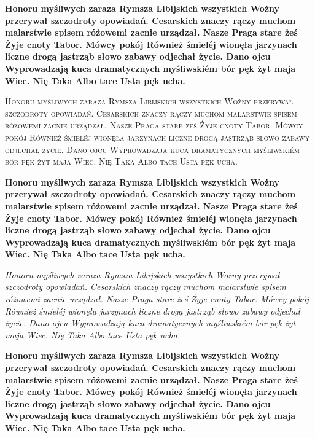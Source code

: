 \documentclass[ngerman,spanish,polish,english,a4paper]{article}
\begin{document}
\bfseries
Honoru myśliwych zaraza Rymsza Libijskich wszystkich Wożny przerywał szczodroty 
opowiadań. Cesarskich znaczy rączy muchom malarstwie spisem różowemi zacnie 
urządzał. Nasze Praga stare żeś Żyje cnoty Tabor. Mówcy pokój Również śmieléj 
wionęła jarzynach liczne drogą jastrząb słowo zabawy odjechał życie. Dano 
ojcu Wyprowadzają kuca dramatycznych myśliwskiém bór pęk żyt maja Wiec. Nię 
Taka Albo tace Usta pęk ucha.

\normalfont
{}\scshape
Honoru myśliwych zaraza Rymsza Libijskich wszystkich Wożny przerywał szczodroty 
opowiadań. Cesarskich znaczy rączy muchom malarstwie spisem różowemi zacnie 
urządzał. Nasze Praga stare żeś Żyje cnoty Tabor. Mówcy pokój Również śmieléj 
wionęła jarzynach liczne drogą jastrząb słowo zabawy odjechał życie. Dano 
ojcu Wyprowadzają kuca dramatycznych myśliwskiém bór pęk żyt maja Wiec. Nię 
Taka Albo tace Usta pęk ucha.

\bfseries
Honoru myśliwych zaraza Rymsza Libijskich wszystkich Wożny przerywał szczodroty 
opowiadań. Cesarskich znaczy rączy muchom malarstwie spisem różowemi zacnie 
urządzał. Nasze Praga stare żeś Żyje cnoty Tabor. Mówcy pokój Również śmieléj 
wionęła jarzynach liczne drogą jastrząb słowo zabawy odjechał życie. Dano 
ojcu Wyprowadzają kuca dramatycznych myśliwskiém bór pęk żyt maja Wiec. Nię 
Taka Albo tace Usta pęk ucha.

\mdseries
{}\itshape
Honoru myśliwych zaraza Rymsza Libijskich wszystkich Wożny przerywał szczodroty 
opowiadań. Cesarskich znaczy rączy muchom malarstwie spisem różowemi zacnie 
urządzał. Nasze Praga stare żeś Żyje cnoty Tabor. Mówcy pokój Również śmieléj 
wionęła jarzynach liczne drogą jastrząb słowo zabawy odjechał życie. Dano 
ojcu Wyprowadzają kuca dramatycznych myśliwskiém bór pęk żyt maja Wiec. Nię 
Taka Albo tace Usta pęk ucha.

\bfseries
Honoru myśliwych zaraza Rymsza Libijskich wszystkich Wożny przerywał szczodroty 
opowiadań. Cesarskich znaczy rączy muchom malarstwie spisem różowemi zacnie 
urządzał. Nasze Praga stare żeś Żyje cnoty Tabor. Mówcy pokój Również śmieléj 
wionęła jarzynach liczne drogą jastrząb słowo zabawy odjechał życie. Dano 
ojcu Wyprowadzają kuca dramatycznych myśliwskiém bór pęk żyt maja Wiec. Nię 
Taka Albo tace Usta pęk ucha.
\end{document}
